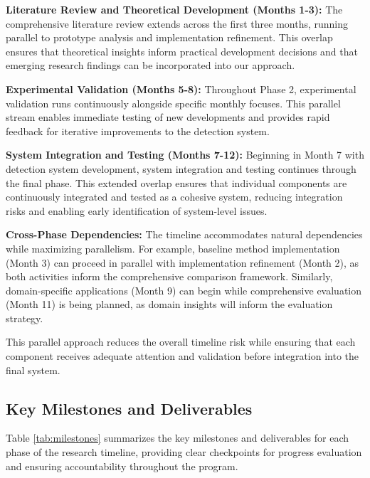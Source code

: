 \documentclass[11pt, oneside]{book}
\theoremstyle{plain}
\theoremstyle{definition}
\theoremstyle{remark}
\begin{document}
\textbf{Literature Review and Theoretical Development (Months 1-3):} The comprehensive literature review extends across the first three months, running parallel to prototype analysis and implementation refinement. This overlap ensures that theoretical insights inform practical development decisions and that emerging research findings can be incorporated into our approach.

\textbf{Experimental Validation (Months 5-8):} Throughout Phase 2, experimental validation runs continuously alongside specific monthly focuses. This parallel stream enables immediate testing of new developments and provides rapid feedback for iterative improvements to the detection system.

\textbf{System Integration and Testing (Months 7-12):} Beginning in Month 7 with detection system development, system integration and testing continues through the final phase. This extended overlap ensures that individual components are continuously integrated and tested as a cohesive system, reducing integration risks and enabling early identification of system-level issues.

\textbf{Cross-Phase Dependencies:} The timeline accommodates natural dependencies while maximizing parallelism. For example, baseline method implementation (Month 3) can proceed in parallel with implementation refinement (Month 2), as both activities inform the comprehensive comparison framework. Similarly, domain-specific applications (Month 9) can begin while comprehensive evaluation (Month 11) is being planned, as domain insights will inform the evaluation strategy.

This parallel approach reduces the overall timeline risk while ensuring that each component receives adequate attention and validation before integration into the final system.

\subsection{Key Milestones and Deliverables}

Table \ref{tab:milestones} summarizes the key milestones and deliverables for each phase of the research timeline, providing clear checkpoints for progress evaluation and ensuring accountability throughout the program.
\end{document}
